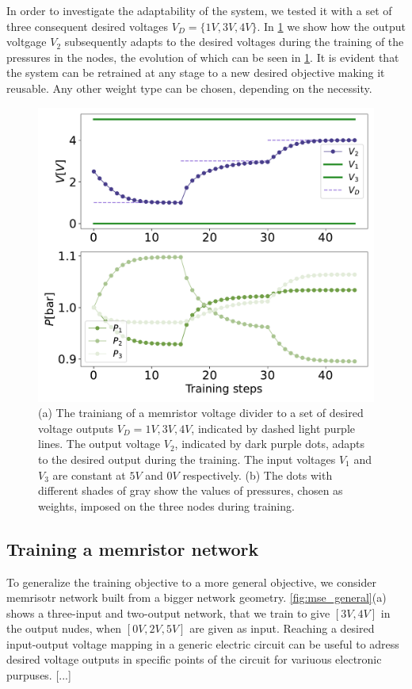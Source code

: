 \documentclass[reprint,superscriptaddress,prb,showkeys]{revtex4-2}
\begin{document}
In order to investigate the adaptability of the system, we tested it with a set of three consequent desired voltages $V_D=\{1V, 3V, 4V\}$. In \cref{fig:evolution_targets} we show how the output voltgage $V_2$ subsequently adapts to the desired voltages during the training of the pressures in the nodes, the evolution of which can be seen in \cref{fig:evolution_targets}. It is evident that the system can be retrained at any stage to a new desired objective making it reusable. Any other weight type can be chosen, depending on the necessity.  

\begin{figure}[h]
    \centering
    \includegraphics[width=0.8\columnwidth]{plots/voltage_divider/evolution_targets.pdf}
    \caption{(a) The trainiang of a memristor voltage divider to a set of desired voltage outputs $V_D = {1V, 3V, 4V}$, indicated by dashed light purple lines. The output voltage $V_2$, indicated by dark purple dots, adapts to the desired output during the training. The input voltages $V_1$ and $V_3$ are constant at $5V$ and $0V$ respectively. (b) The dots with different shades of gray show the values of pressures, chosen as weights, imposed on the three nodes during training.}\label{fig:evolution_targets}
\end{figure}

\subsection{Training a memristor network}

To generalize the training objective to a more general objective, we consider memrisotr network built from a bigger network geometry. \cref{fig:mse_general}(a) shows a three-input and two-output network, that we train to give $[3V, 4V]$ in the output nudes, when $[0V, 2V, 5V]$ are given as input. Reaching a desired input-output voltage mapping in a generic electric circuit can be useful to adress desired voltage outputs in specific points of the circuit for variuous electronic purpuses. [...]
\end{document}
